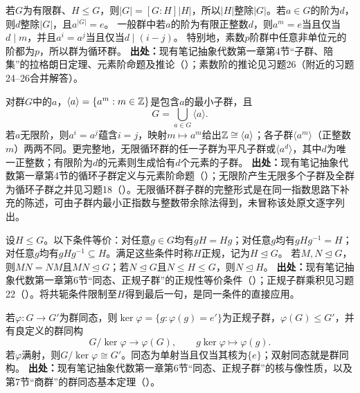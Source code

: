 \begin{reviewtheorem}[拉格朗日定理与元素的阶]\label{tool:g-lagrange}
若$G$为有限群、$H\leq G$，则$|G|=[G:H]|H|$，所以$|H|$整除$|G|$。若$a\in G$的阶为$d$，则$d$整除$|G|$，且$a^{|G|}=e$。
一般群中若$a$的阶为有限正整数$d$，则$a^m=e$当且仅当$d\mid m$，并且$a^i=a^j$当且仅当$d\mid(i-j)$。
特别地，素数$p$阶群中任意非单位元的阶都为$p$，所以群为循环群。
\textbf{出处：}现有笔记抽象代数第一章第4节“子群、陪集”的拉格朗日定理、元素阶命题及推论（）；素数阶的推论见习题26（附近的习题24--26合并解答）。
\end{reviewtheorem}

\begin{reviewprop}[循环子群与无限阶元素]\label{tool:g-cyclic}
对群$G$中的$a$，$\langle a\rangle=\{a^m:m\in\mathbb Z\}$是包含$a$的最小子群，且
\[
G=\bigcup_{a\in G}\langle a\rangle.
\]
若$a$无限阶，则$a^i=a^j$蕴含$i=j$，映射$m\mapsto a^m$给出$\mathbb Z\cong\langle a\rangle$；各子群$\langle a^m\rangle$（正整数$m$）两两不同。更完整地，无限循环群的任一子群为平凡子群或$\langle a^d\rangle$，其中$d$为唯一正整数；有限阶为$d$的元素则生成恰有$d$个元素的子群。
\textbf{出处：}现有笔记抽象代数第一章第4节的循环子群定义与元素阶命题（）；无限阶产生无限多个子群及全群为循环子群之并见习题18（）。无限循环群子群的完整形式是在同一指数思路下补充的陈述，可由子群内最小正指数与整数带余除法得到，未冒称该处原文逐字列出。
\end{reviewprop}

\begin{reviewprop}[正规子群判别及正规子群的乘积]\label{tool:g-normal}
设$H\leq G$。以下条件等价：对任意$g\in G$均有$gH=Hg$；对任意$g$均有$gHg^{-1}=H$；对任意$g$均有$gHg^{-1}\subseteq H$。满足这些条件时称$H$正规，记为$H\trianglelefteq G$。
若$M,N\trianglelefteq G$，则$MN=NM$且$MN\trianglelefteq G$；若$N\trianglelefteq G$且$N\leq H\leq G$，则$N\trianglelefteq H$。
\textbf{出处：}现有笔记抽象代数第一章第6节“同态、正规子群”的正规性等价条件（）；正规子群乘积见习题22（）。将共轭条件限制至$H$得到最后一句，是同一条件的直接应用。
\end{reviewprop}

\begin{reviewtheorem}[群同态基本定理]\label{tool:g-first-iso}
若$\varphi:G\to G'$为群同态，则$\ker\varphi=\{g:\varphi(g)=e'\}$为正规子群，$\varphi(G)\leq G'$，并有良定义的群同构
\[
G/\ker\varphi\longrightarrow\varphi(G),\qquad
g\ker\varphi\longmapsto\varphi(g).
\]
若$\varphi$满射，则$G/\ker\varphi\cong G'$。同态为单射当且仅当其核为$\{e\}$；双射同态就是群同构。
\textbf{出处：}现有笔记抽象代数第一章第6节“同态、正规子群”的核与像性质，以及第7节“商群”的群同态基本定理（）。
\end{reviewtheorem}


